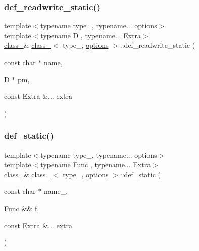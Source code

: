 \mbox{\label{classclass___ab5f2fa205966fb138364019ff23d96de}} 
\subsubsection{\texorpdfstring{def\_readwrite\_static()}{def\_readwrite\_static()}}
{\footnotesize\ttfamily template$<$typename type\+\_\+, typename... options$>$ \\
template$<$typename D , typename... Extra$>$ \\
\mbox{\hyperlink{classclass__}{class\+\_\+}}\& \mbox{\hyperlink{classclass__}{class\+\_\+}}$<$ type\+\_\+, \mbox{\hyperlink{classoptions}{options}} $>$\+::def\+\_\+readwrite\+\_\+static (\begin{DoxyParamCaption}\item[{const char $\ast$}]{name,  }\item[{D $\ast$}]{pm,  }\item[{const Extra \&...}]{extra }\end{DoxyParamCaption})\hspace{0.3cm}{\ttfamily [inline]}}

\mbox{\label{classclass___a691aae941b44e34c7351731f269fcaff}} 
\subsubsection{\texorpdfstring{def\_static()}{def\_static()}}
{\footnotesize\ttfamily template$<$typename type\+\_\+, typename... options$>$ \\
template$<$typename Func , typename... Extra$>$ \\
\mbox{\hyperlink{classclass__}{class\+\_\+}}\& \mbox{\hyperlink{classclass__}{class\+\_\+}}$<$ type\+\_\+, \mbox{\hyperlink{classoptions}{options}} $>$\+::def\+\_\+static (\begin{DoxyParamCaption}\item[{const char $\ast$}]{name\+\_\+,  }\item[{Func \&\&}]{f,  }\item[{const Extra \&...}]{extra }\end{DoxyParamCaption})\hspace{0.3cm}{\ttfamily [inline]}}



